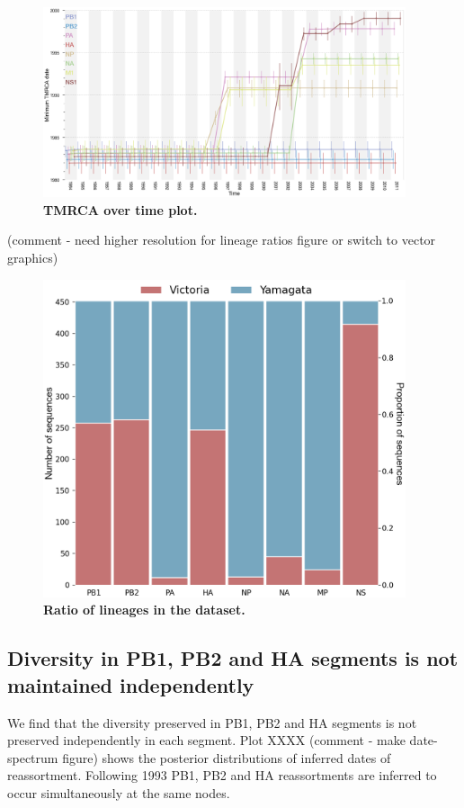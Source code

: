 \documentclass[11pt,oneside,letterpaper]{article}
\begin{document}
\begin{figure}[h]
	\centering		
	\includegraphics[width=0.95\textwidth]{figures/InfB_tmrcaOT_lines.png}
	\caption{\textbf{TMRCA over time plot.}}
	\label{tmrcaOT}
\end{figure}

(comment - need higher resolution for lineage ratios figure or switch to vector graphics)
\begin{figure}[h]
	\centering		
	\includegraphics[width=0.95\textwidth]{figures/InfB_LineageRatios.png}
	\caption{\textbf{Ratio of lineages in the dataset.}}
	\label{lineageRatios}
\end{figure}

\subsection*{Diversity in PB1, PB2 and HA segments is not maintained independently}
We find that the diversity preserved in PB1, PB2 and HA segments is not preserved independently in each segment.
Plot XXXX (comment - make date-spectrum figure) shows the posterior distributions of inferred dates of reassortment.
Following 1993 PB1, PB2 and HA reassortments are inferred to occur simultaneously at the same nodes.
\end{document}
